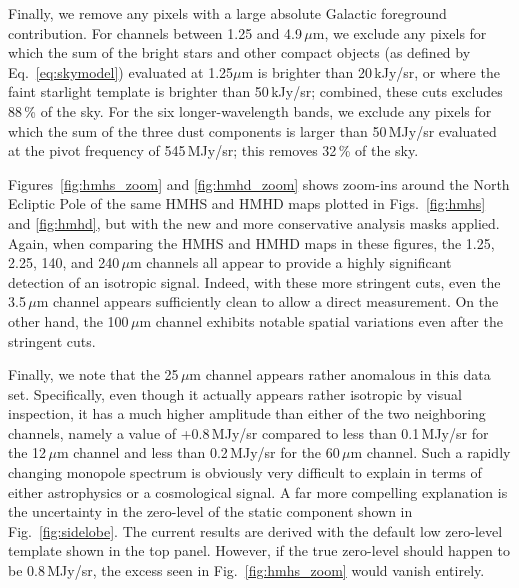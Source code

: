 \documentclass{aa}
\begin{document}
Finally, we remove any pixels with a large absolute Galactic
foreground contribution. For channels between 1.25 and
4.9\,$\mu\mathrm{m}$, we exclude any pixels for which the sum of the
bright stars and other compact objects (as defined by
Eq.~\ref{eq:skymodel}) evaluated at 1.25$\mu\mathrm{m}$ is brighter
than 20\,kJy/sr, or where the faint starlight template is brighter
than 50\,kJy/sr; combined, these cuts excludes 88\,\% of the sky. For
the six longer-wavelength bands, we exclude any pixels for which the
sum of the three dust components is larger than 50\,MJy/sr evaluated
at the pivot frequency of 545\,MJy/sr; this removes 32\,\% of the sky.


Figures~\ref{fig:hmhs_zoom} and \ref{fig:hmhd_zoom} shows zoom-ins
around the North Ecliptic Pole of the same HMHS and HMHD maps plotted
in Figs.~\ref{fig:hmhs} and \ref{fig:hmhd}, but with the new and more
conservative analysis masks applied. Again, when comparing the HMHS
and HMHD maps in these figures, the 1.25, 2.25, 140, and
240$\,\mu\mathrm{m}$ channels all appear to provide a highly
significant detection of an isotropic signal. Indeed, with these more
stringent cuts, even the 3.5$\,\mu\mathrm{m}$ channel appears
sufficiently clean to allow a direct measurement. On the other hand,
the 100$\,\mu\mathrm{m}$ channel exhibits notable spatial variations
even after the stringent cuts.

Finally, we note that the 25\,$\mu\mathrm{m}$ channel appears rather
anomalous in this data set. Specifically, even though it actually
appears rather isotropic by visual inspection, it has a much higher
amplitude than either of the two neighboring channels, namely a value
of +0.8\,MJy/sr compared to less than 0.1\,MJy/sr for the
12$\,\mu\mathrm{m}$ channel and less than 0.2\,MJy/sr for the
60$\,\mu\mathrm{m}$ channel. Such a rapidly changing monopole spectrum is
obviously very difficult to explain in terms of either astrophysics or
a cosmological signal. A far more compelling explanation is the
uncertainty in the zero-level of the static component shown in
Fig.~\ref{fig:sidelobe}. The current results are derived with the
default low zero-level template shown in the top panel. However, if
the true zero-level should happen to be 0.8\,MJy/sr, the excess seen
in Fig.~\ref{fig:hmhs_zoom} would vanish entirely.
\end{document}
